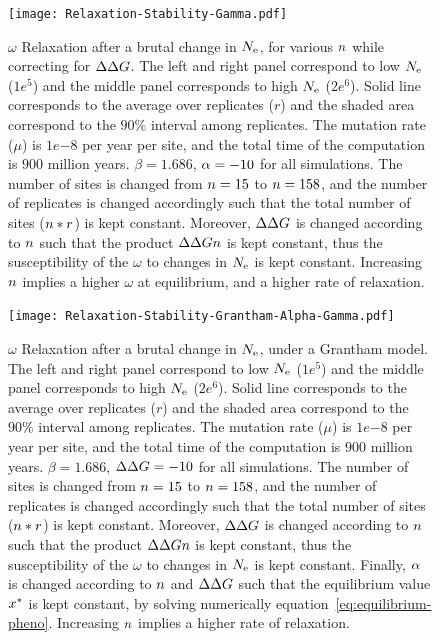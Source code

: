 \begin{figure}[H]
	\centering
	\texttt{[image: Relaxation-Stability-Gamma.pdf]}
	\caption[Relaxation time of $\omega$ dependence on $\NbrSites$, while correction for $\DeltaDeltaG$]{
	$\omega$ Relaxation after a brutal change in $N_{\mathrm{e}}$, for various $\NbrSites$ while correcting for $\DeltaDeltaG$.
	The left and right panel correspond to low $N_{\mathrm{e}}$ ($1e^{5}$) and the middle panel corresponds to high $N_{\mathrm{e}}$ ($2e^{6}$).
	Solid line corresponds to the average over replicates ($r$) and the shaded area correspond to the $90\%$ interval among replicates.
	The mutation rate ($\mu$) is $1e{-8}$ per year per site, and the total time of the computation is $900$ million years.
	$\beta=1.686$, $\alpha=-10$ for all simulations. The number of sites is changed from $n=15$ to $n=158$, and the number of replicates is changed accordingly such that the total number of sites ($n*r$) is kept constant.
	Moreover, $\DeltaDeltaG$ is changed according to $\NbrSites$ such that the product $\Delta \Delta Gn$ is kept constant, thus the  susceptibility of the $\omega$ to changes in $N_{\mathrm{e}}$ is kept constant.
	Increasing $\NbrSites$ implies a higher $\omega$ at equilibrium, and a higher rate of relaxation.
	}
\end{figure}

\begin{figure}[H]
	\centering
	\texttt{[image: Relaxation-Stability-Grantham-Alpha-Gamma.pdf]}
	\caption[Relaxation time of $\omega$ for the Grantham model]{
	$\omega$ Relaxation after a brutal change in $N_{\mathrm{e}}$, under a Grantham model.
	The left and right panel correspond to low $N_{\mathrm{e}}$ ($1e^{5}$) and the middle panel corresponds to high $N_{\mathrm{e}}$ ($2e^{6}$).
	Solid line corresponds to the average over replicates ($r$) and the shaded area correspond to the $90\%$ interval among replicates.
	The mutation rate ($\mu$) is $1e{-8}$ per year per site, and the total time of the computation is $900$ million years.
	$\beta=1.686$, $\Delta \Delta G=-10$ for all simulations. The number of sites is changed from $n=15$ to $n=158$, and the number of replicates is changed accordingly such that the total number of sites ($n*r$) is kept constant.
	Moreover, $\DeltaDeltaG$ is changed according to $\NbrSites$ such that the product $\Delta \Delta Gn$ is kept constant, thus the  susceptibility of the $\omega$ to changes in $N_{\mathrm{e}}$ is kept constant.
	Finally, $\alpha$ is changed according to $\NbrSites$ and $\DeltaDeltaG$ such that the equilibrium value $x^{*}$ is kept constant, by solving numerically equation~\ref{eq:equilibrium-pheno}.
	Increasing $\NbrSites$ implies a higher rate of relaxation.}
\end{figure}


